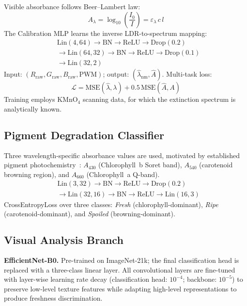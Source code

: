 \documentclass[conference]{IEEEtran}
\begin{document}
Visible absorbance follows Beer--Lambert law:
\begin{equation}
  A_\lambda = \log_{10}\!\left(\frac{I_0}{I}\right)
             = \varepsilon_\lambda \, c \, l
  \label{eq:beer}
\end{equation}
The Calibration MLP learns the inverse LDR-to-spectrum mapping:
\begin{align*}
  &\text{Lin}(4,64)\to\text{BN}\to\text{ReLU}\to\text{Drop}(0.2) \\
  &\to\text{Lin}(64,32)\to\text{BN}\to\text{ReLU}\to\text{Drop}(0.1) \\
  &\to\text{Lin}(32,2)
\end{align*}
Input: $(R_\text{raw}, G_\text{raw}, B_\text{raw}, \text{PWM})$;
output: $(\hat{\lambda}_\text{nm}, \hat{A})$. Multi-task loss:
\begin{equation}
  \mathcal{L} = \text{MSE}(\hat{\lambda}, \lambda)
                + 0.5\,\text{MSE}(\hat{A}, A)
  \label{eq:calib_loss}
\end{equation}
Training employs KMnO$_4$ scanning data, for which the extinction
spectrum is analytically known.

\subsection{Pigment Degradation Classifier}

Three wavelength-specific absorbance values are used, motivated by
established pigment photochemistry~\cite{Fodor2024}: $A_{430}$
(Chlorophyll~b Soret band), $A_{540}$ (carotenoid browning region),
and $A_{660}$ (Chlorophyll~a Q-band).
\begin{align*}
  &\text{Lin}(3,32)\to\text{BN}\to\text{ReLU}\to\text{Drop}(0.2) \\
  &\to\text{Lin}(32,16)\to\text{BN}\to\text{ReLU}\to\text{Lin}(16,3)
\end{align*}
CrossEntropyLoss over three classes: \textit{Fresh}
(chlorophyll-dominant), \textit{Ripe} (carotenoid-dominant), and
\textit{Spoiled} (browning-dominant).

\subsection{Visual Analysis Branch}

\textbf{EfficientNet-B0.} Pre-trained on ImageNet-21k; the final
classification head is replaced with a three-class linear layer. All
convolutional layers are fine-tuned with layer-wise learning rate
decay (classification head: $10^{-4}$; backbone: $10^{-5}$) to
preserve low-level texture features while adapting high-level
representations to produce freshness discrimination.
\end{document}
